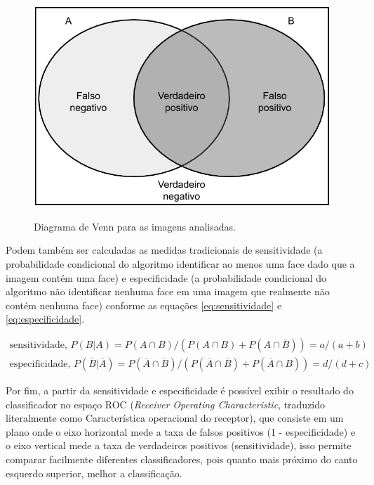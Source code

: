 \begin{figure}[htbp]
    \centering
    \caption{Diagrama de Venn para as imagens analisadas.}
    \includegraphics[scale=.4]{figs/venn-diagram.png}
    \label{fig:venn_diagram}
\end{figure}

Podem também ser calculadas as medidas tradicionais de sensitividade (a probabilidade condicional do algoritmo identificar ao menos uma face dado que a imagem contém uma face) e especificidade (a probabilidade condicional do algoritmo não identificar nenhuma face em uma imagem que realmente não contém nenhuma face) conforme as equações \ref{eq:sensitividade} e \ref{eq:especificidade}.

\begin{align} \label{eq:sensitividade}
    \text{sensitividade, } P(B|A) = P(A \cap B) / (P(A \cap B) + P(A \cap \overline{B})) = a/(a + b) \\
    \label{eq:especificidade}
    \text{especificidade, } P(\overline{B} | \overline{A}) = P(\overline{A} \cap \overline{B}) / (P(\overline{A} \cap \overline{B}) + P(\overline{A} \cap B)) = d/(d + c)
\end{align}

Por fim, a partir da sensitividade e especificidade é possível exibir o resultado do classificador no espaço ROC (\textit{Receiver Operating Characteristic}, traduzido literalmente como Característica operacional do receptor), que consiste em um plano onde o eixo horizontal mede a taxa de falsos positivos (1 - especificidade) e o eixo vertical mede a taxa de verdadeiros positivos (sensitividade), isso permite comparar facilmente diferentes classificadores, pois quanto mais próximo do canto esquerdo superior, melhor a classificação.

